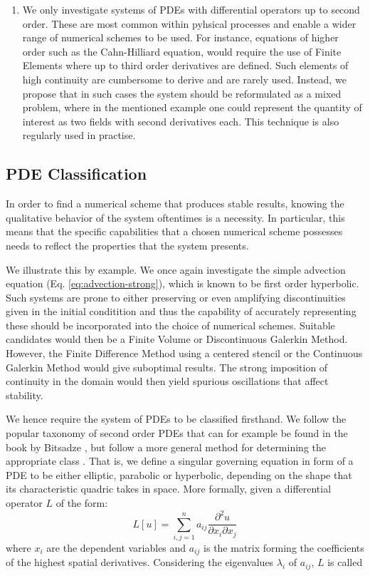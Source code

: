 \documentclass[sn-mathphys,Numbered]{sn-jnl}%
\theoremstyle{thmstyleone}%
\theoremstyle{thmstyletwo}%
\theoremstyle{thmstylethree}%
\begin{document}
\begin{enumerate}
    Hence, we choose to follow this path despite some shortcomings regarding generality.
    \item We only investigate systems of PDEs with differential operators up to second order.
    These are most common within pyhsical processes and enable a wider range of numerical schemes to be used.
    For instance, equations of higher order such as the Cahn-Hilliard equation, would require the use of Finite Elements where up to third order derivatives are defined.
    Such elements of high continuity are cumbersome to derive and are rarely used.
    Instead, we propose that in such cases the system should be reformulated as a mixed problem, where in the mentioned example one could represent the quantity of interest as two fields with second derivatives each.
    This technique is also regularly used in practise.
\end{enumerate}

\subsection{PDE Classification}\label{sec:pde-classification}

In order to find a numerical scheme that produces stable results, knowing the qualitative behavior of the system oftentimes is a necessity.
In particular, this means that the specific capabilities that a chosen numerical scheme possesses needs to reflect the properties that the system presents.

We illustrate this by example. We once again investigate the simple advection equation (Eq. \ref{eq:advection-strong}), which is known to be first order hyperbolic.
Such systems are prone to either preserving or even amplifying discontinuities given in the initial conditition and thus the capability of accurately representing these should be incorporated into the choice of numerical schemes.
Suitable candidates would then be a Finite Volume or Discontinuous Galerkin Method.
However, the Finite Difference Method using a centered stencil or the Continuous Galerkin Method would give suboptimal results. The strong imposition of continuity in the domain would then yield spurious oscillations that affect stability.

We hence require the system of PDEs to be classified firsthand. We follow the popular taxonomy of second order PDEs that can for example be found in the book by Bitsadze \cite{bitsadze1988some}, but follow a more general method for determining the appropriate class \cite{pinchoverIntroductionPartialDifferential2005}. 
That is, we define a singular governing equation in form of a PDE to be either elliptic, parabolic or hyperbolic, depending on the shape that its characteristic quadric takes in space.
More formally, given a differential operator $L$ of the form:
\begin{equation}\label{eq:pde-classification}
    L[u] = \sum\limits_{i,j=1}^{n} a_{ij} \frac{\partial^2 u}{\partial x_i \partial x_j}
\end{equation}
where $x_i$ are the dependent variables and $a_{ij}$ is the matrix forming the coefficients of the highest spatial derivatives.
Considering the eigenvalues $\lambda_i$ of $a_{ij}$, $L$ is called
\end{document}

